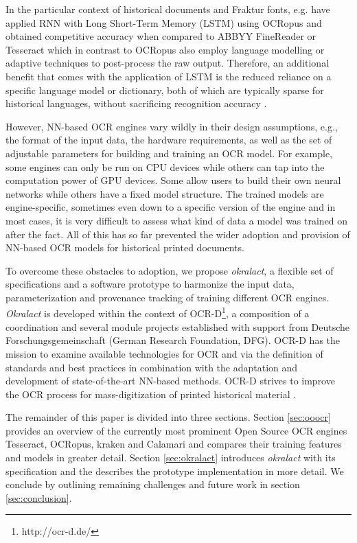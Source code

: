 \documentclass[sigconf]{acmart}
\begin{document}
In the particular context of historical documents and Fraktur fonts, e.g.
\cite{breuel2013high} have applied RNN with Long Short-Term Memory (LSTM) using OCRopus and obtained 
competitive accuracy when compared to ABBYY FineReader or Tesseract which in contrast to OCRopus also employ language modelling or adaptive techniques to post-process the raw output. 
Therefore, an additional benefit that comes with the application of LSTM is the reduced reliance on a specific language model or dictionary, both of which are typically sparse for historical languages, without sacrificing recognition accuracy \cite{ul2013can}.


However, NN-based OCR engines vary wildly in their design
assumptions, e.g., the format of the input data, the hardware
requirements, as well as the set of adjustable parameters for
building and training an OCR model. For example, some engines can
only be run on CPU devices while others can tap into the
computation power of GPU devices. Some allow users to build their
own neural networks while others have a fixed model structure. The
trained models are engine-specific, sometimes even down to a specific
version of the engine and in most cases, it is very difficult to
assess what kind of data a model was trained on after the fact.  All of this has so far prevented the wider adoption and provision of NN-based 
OCR models for historical printed documents.

To overcome these obstacles to adoption, we propose
\textit{okralact}, a flexible set of specifications and a software
prototype to harmonize the input data, parameterization and
provenance tracking of training different OCR engines.
\textit{Okralact} is developed within the context of
OCR-D\footnote{http://ocr-d.de/}, a composition of a
coordination and several module projects established with support
from Deutsche Forschungsgemeinschaft (German Research Foundation,
DFG). OCR-D has the mission to examine available technologies for OCR and via the 
definition of standards and best practices in combination with the adaptation and development of state-of-the-art NN-based methods. OCR-D strives to improve the OCR process for mass-digitization of 
printed historical material \cite{neudecker2019datech}.  

The remainder of this paper is divided into three sections. Section
\ref{sec:ooocr} provides an overview of the currently most prominent Open Source OCR engines Tesseract, OCRopus, kraken and Calamari and compares their training features and models in greater detail. Section \ref{sec:okralact} introduces \textit{okralact} with its
specification and the describes the prototype implementation in more detail. We conclude by 
outlining remaining challenges and future work in section \ref{sec:conclusion}. 
\end{document}
